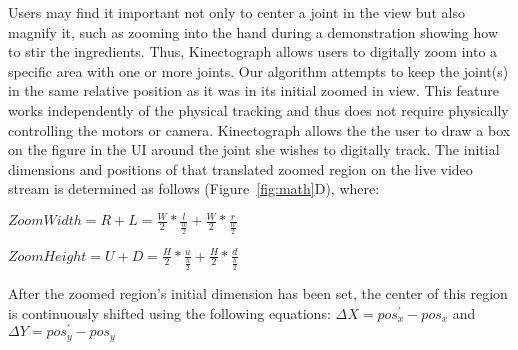 Users may find it important not only to center a joint in the view but also magnify it, such as zooming into the hand during a demonstration showing how to stir the ingredients.
%
Thus, Kinectograph allows users to digitally zoom into a specific area with one or more joints. Our algorithm attempts to keep the joint(s) in the same relative position as it was in its initial zoomed in view. This feature works independently of the physical tracking and thus does not require physically controlling the motors or camera.
%
Kinectograph allows the the user to draw a box on the figure in the UI around the joint she wishes to digitally track. The initial dimensions and positions of that translated zoomed region on the live video stream is determined as follows (Figure~\ref{fig:math}D), where:

\vspace{12pt}
$ZoomWidth= R + L = \frac{W}{2}*\frac{l}{\frac{w}{2}} + \frac{W}{2}*\frac{r}{\frac{w}{2}}$

\vspace{12pt}
$ZoomHeight= U + D = \frac{H}{2}*\frac{u}{\frac{h}{2}}+ \frac{H}{2}*\frac{d}{\frac{h}{2}}$
\vspace{12pt}

After the zoomed region's initial dimension has been set, the center of this region is continuously shifted using the following equations: $\Delta X = pos_{x}^{'}-pos_{x}$ and $\Delta Y = pos_{y}^{'}-pos_{y}$

